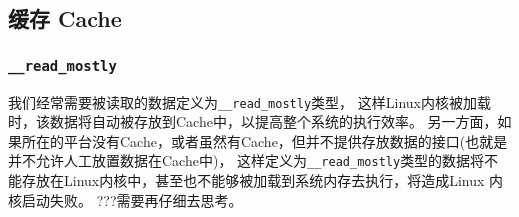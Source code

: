 		\subsection{缓存 Cache}
			\subsubsection{\texttt{__read_mostly}}
				我们经常需要被读取的数据定义为\texttt{__read_mostly}类型，
				这样Linux内核被加载时，该数据将自动被存放到Cache中，以提高整个系统的执行效率。
				另一方面，如果所在的平台没有Cache，或者虽然有Cache，但并不提供存放数据的接口(也就是并不允许人工放置数据在Cache中)，
				这样定义为\texttt{__read_mostly}类型的数据将不能存放在Linux内核中，甚至也不能够被加载到系统内存去执行，将造成Linux 内核启动失败。
				???需要再仔细去思考。
				
